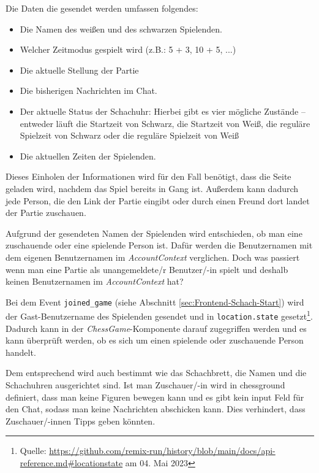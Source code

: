 Die Daten die gesendet werden umfassen folgendes:
\begin{itemize}
\item Die Namen des weißen und des schwarzen Spielenden.
\item Welcher Zeitmodus gespielt wird (z.B.: 5 + 3, 10 + 5, ...)
\item Die aktuelle Stellung der Partie
\item Die bisherigen Nachrichten im Chat.
\item Der aktuelle Status der Schachuhr: Hierbei gibt es vier mögliche Zustände – entweder läuft die Startzeit von Schwarz, die Startzeit von Weiß, die reguläre Spielzeit von Schwarz oder die reguläre Spielzeit von Weiß
\item Die aktuellen Zeiten der Spielenden.
\end{itemize}
Dieses Einholen der Informationen wird für den Fall benötigt, dass die Seite geladen wird, nachdem das Spiel bereits in Gang ist. Außerdem kann dadurch jede Person, die den Link der Partie eingibt oder durch einen Freund dort landet der Partie zuschauen.

Aufgrund der gesendeten Namen der Spielenden wird entschieden, ob man eine zuschauende oder eine spielende Person ist. Dafür werden die Benutzernamen mit dem eigenen Benutzernamen im \textit{AccountContext} verglichen. Doch was passiert wenn man eine Partie als unangemeldete/r Benutzer/-in spielt und deshalb keinen Benutzernamen im \textit{AccountContext} hat?

Bei dem Event \verb|joined_game| (siehe Abschnitt \ref{sec:Frontend-Schach-Start}) wird der Gast-Benutzername des Spielenden gesendet und in \verb|location.state| gesetzt\footnote{Quelle: \url{https://github.com/remix-run/history/blob/main/docs/api-reference.md\#locationstate} am 04. Mai 2023}. Dadurch kann in der \textit{ChessGame}-Komponente darauf zugegriffen werden und es kann überprüft werden, ob es sich um einen spielende oder zuschauende Person handelt.


Dem entsprechend wird auch bestimmt wie das Schachbrett, die Namen und die Schachuhren ausgerichtet sind. Ist man Zuschauer/-in wird in chessground definiert, dass man keine Figuren bewegen kann und es gibt kein input Feld für den Chat, sodass man keine Nachrichten abschicken kann. Dies verhindert, dass Zuschauer/-innen Tipps geben könnten.

